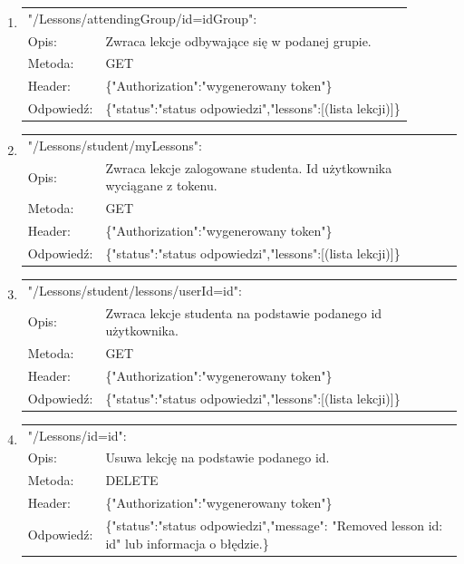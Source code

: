 \documentclass[12pt, titlepage]{article}
\begin{document}
\begin{enumerate}
	\item
	{\renewcommand{\arraystretch}{1.5}
	\begin{tabular}[t]{p{3cm} p{15cm}}
	\multicolumn{2}{l}{"/Lessons/attendingGroup/id={idGroup}":} \\
	Opis: &  Zwraca lekcje odbywające się w podanej grupie. \\
	Metoda: & GET \\
	Header: & \{"Authorization":"wygenerowany token"\} \\
	Odpowiedź: & \{"status":"status odpowiedzi",\newline "lessons":[(lista lekcji)]\} 
	\end{tabular}}
	
	\item
	{\renewcommand{\arraystretch}{1.5}
	\begin{tabular}[t]{p{3cm} p{15cm}}
	\multicolumn{2}{l}{"/Lessons/student/myLessons":} \\
	Opis: & Zwraca lekcje zalogowane studenta. \newline Id użytkownika wyciągane z tokenu. \\
	Metoda: & GET \\
	Header: & \{"Authorization":"wygenerowany token"\} \\
	Odpowiedź: & \{"status":"status odpowiedzi",\newline "lessons":[(lista lekcji)]\}
	\end{tabular}}
	
	\item
	{\renewcommand{\arraystretch}{1.5}
	\begin{tabular}[t]{p{3cm} p{15cm}}
	\multicolumn{2}{l}{"/Lessons/student/lessons/userId={id}":} \\
	Opis: &  Zwraca lekcje studenta na podstawie \newline podanego id użytkownika. \\
	Metoda: & GET \\
	Header: & \{"Authorization":"wygenerowany token"\} \\
	Odpowiedź: & \{"status":"status odpowiedzi",\newline "lessons":[(lista lekcji)]\}
	\end{tabular}}
	
	\item
	{\renewcommand{\arraystretch}{1.5}
	\begin{tabular}[t]{p{3cm} p{15cm}}
	\multicolumn{2}{l}{"/Lessons/id={id}":} \\
	Opis: &  Usuwa lekcję na podstawie podanego id. \\
	Metoda: & DELETE \\
	Header: & \{"Authorization":"wygenerowany token"\} \\
	Odpowiedź: & \{"status":"status odpowiedzi",\newline "message": "Removed lesson id: {id}" lub informacja o błędzie.\}
	\end{tabular}}
	

\end{enumerate}
\end{document}
